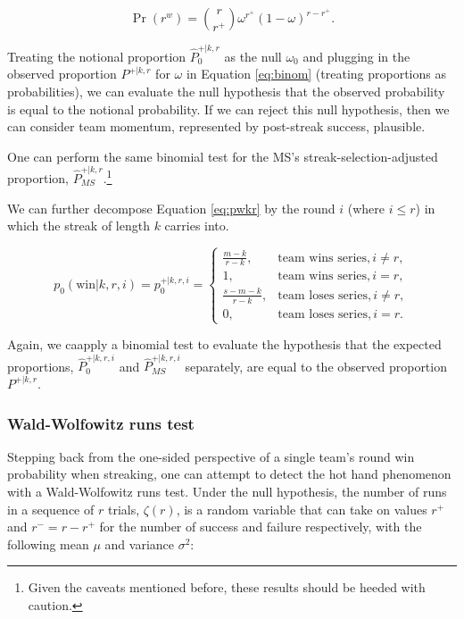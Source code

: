\documentclass{article}
\begin{document}
\begin{equation}\label{eq:binom}
\Pr(r^w) = {\binom {r}{r^+}} \omega^{r^+}(1-\omega)^{r-r^+}.
\end{equation}

Treating the notional proportion \(\hat{P}^{+|k,r}_0\) as the null
\(\omega_0\) and plugging in the observed proportion \(P^{+|k,r}\) for
\(\omega\) in Equation \ref{eq:binom} (treating proportions as
probabilities), we can evaluate the null hypothesis that the observed
probability is equal to the notional probability. If we can reject this
null hypothesis, then we can consider team momentum, represented by
post-streak success, plausible.

One can perform the same binomial test for the MS's
streak-selection-adjusted proportion,
\(\hat{P}^{+|k,r}_{MS}\).\footnote{Given the caveats mentioned before,
  these results should be heeded with caution.}

We can further decompose Equation \ref{eq:pwkr} by the round \(i\)
(where \(i \leq r\)) in which the streak of length \(k\) carries into.

\begin{equation}\label{eq:pwkri}
p_0(\text{win} | k, r, i) = p^{+|k,r,i}_0 = \begin{cases}
\frac{m - k}{r - k}, & \text{team wins series}, i \neq r, \\
1, & \text{team wins series}, i = r, \\
\frac{s - m - k}{r - k}, & \text{team loses series}, i \neq r, \\
0, & \text{team loses series}, i = r.
\end{cases}
\end{equation}

Again, we caapply a binomial test to evaluate the hypothesis that the
expected proportions, \(\hat{P}^{+|k,r,i}_0\) and
\(\hat{P}^{+|k,r,i}_{MS}\) separately, are equal to the observed
proportion \(P^{+|k,r}\).

\hypertarget{wald-wolfowitz-runs-test}{%
\subsubsection{Wald-Wolfowitz runs
test}\label{wald-wolfowitz-runs-test}}

Stepping back from the one-sided perspective of a single team's round
win probability when streaking, one can attempt to detect the hot hand
phenomenon with a Wald-Wolfowitz runs test. Under the null hypothesis,
the number of runs in a sequence of \(r\) trials, \(\zeta(r)\), is a
random variable that can take on values \(r^+\) and \(r^- = r - r^+\)
for the number of success and failure respectively, with the following
mean \(\mu\) and variance \(\sigma^2\):
\end{document}
